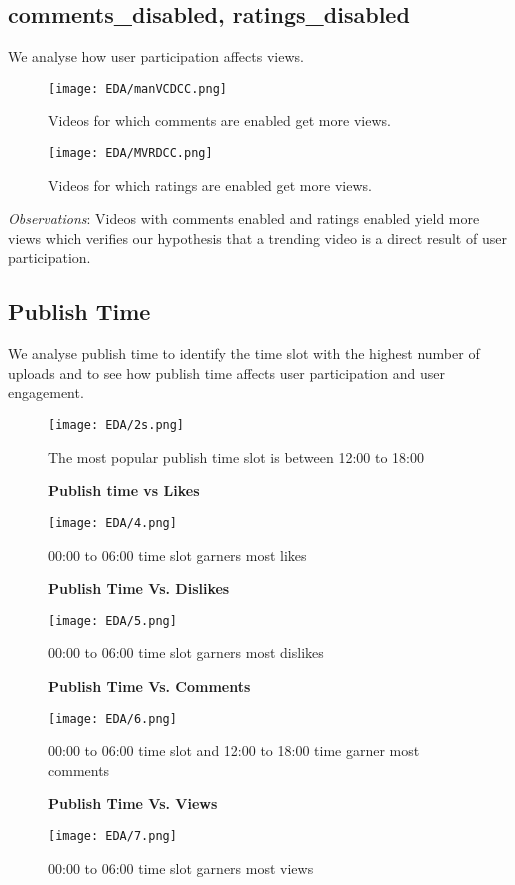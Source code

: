 \documentclass[runningheads]{llncs}
\begin{document}
\subsection{comments\_disabled, ratings\_disabled}
We analyse how user participation affects views.
\begin{figure}[H]
\centering
\begin{minipage}{.5\textwidth}
  \centering
  \texttt{[image: EDA/manVCDCC.png]}
  \caption{Videos for which comments are enabled get more views.}
\end{minipage}%
\begin{minipage}{.5\textwidth}
  \centering
  \texttt{[image: EDA/MVRDCC.png]}
  \caption{Videos for which ratings are enabled get more views.}
\end{minipage}
\end{figure}
\textit{Observations}:
Videos with comments enabled and ratings enabled yield more views which verifies our hypothesis that a trending video is a direct result of user participation. 
\subsection{Publish Time}
We analyse publish time to identify the time slot with the highest number of uploads and to see how publish time affects user participation and user engagement. 
\begin{figure}[H]
\centering
  \texttt{[image: EDA/2s.png]}
  \caption{The most popular publish time slot is between 12:00 to 18:00}
\end{figure}
\begin{figure}[H]
\centering
  \textbf{Publish time vs Likes}\par\medskip
  \texttt{[image: EDA/4.png]}
  \caption{00:00 to 06:00 time slot garners most likes}
 \end{figure}
 \begin{figure}
 \centering
  \textbf{Publish Time Vs. Dislikes}\par\medskip
  \texttt{[image: EDA/5.png]}
  \caption{00:00 to 06:00 time slot garners most dislikes}
\end{figure}
\begin{figure}[H]
\centering
  \textbf{Publish Time Vs. Comments}\par\medskip
  \texttt{[image: EDA/6.png]}
  \caption{00:00 to 06:00 time slot and 12:00 to 18:00 time garner most comments} 
\end{figure}
\begin{figure}
  \centering
  \textbf{Publish Time Vs. Views}\par\medskip
   \texttt{[image: EDA/7.png]}
  \caption{00:00 to 06:00 time slot garners most views} 
\end{figure}
\end{document}

